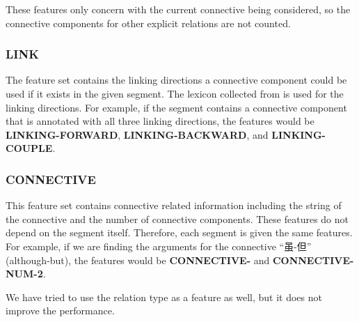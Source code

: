 These features only concern with the current connective being considered, so
the connective components for other explicit relations are not counted.

\subsubsection{LINK}

The feature set contains the linking directions a connective component
could be used if it exists in the given segment. The lexicon collected
from \cite{huang2014interpretation} is used for the linking directions.
For example, if the segment contains a connective component that is
annotated with all three linking directions, the features would be
\textbf{LINKING-FORWARD}, \textbf{LINKING-BACKWARD}, and \textbf{LINKING-COUPLE}.

\subsubsection{CONNECTIVE}

This feature set contains connective related information including the string
of the connective and the number of connective components. These features
do not depend on the segment itself. Therefore, each segment is given the
same features. For example, if we are finding the arguments for the connective
``虽-但'' (although-but), the features would be \textbf{CONNECTIVE-}
and \textbf{CONNECTIVE-NUM-2}.

We have tried to use the relation type as a feature as well, but it does not
improve the performance.

